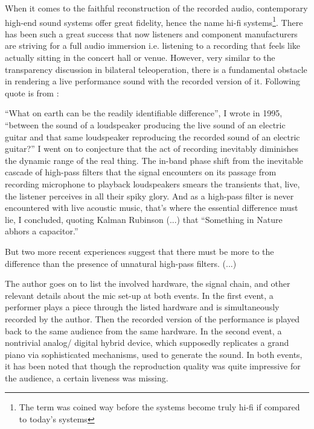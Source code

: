 When it comes to the faithful reconstruction of the recorded audio, contemporary high-end sound systems offer great fidelity, hence 
the name hi-fi systems\footnote{The term was coined way before the systems become truly hi-fi if compared to today's systems}. There has 
been such a great success that now listeners and component manufacturers are striving for a full audio immersion i.e. listening to 
a recording that feels like actually sitting in the concert hall or venue. However, very similar to the transparency discussion 
in bilateral teleoperation, there is a fundamental obstacle in rendering a live performance sound with the recorded version of it. 
Following quote is from \cite{atkinson}:

\begin{displayquote}
\enquote{What on earth can be the readily identifiable difference}, I wrote in 1995, \enquote{between the sound of a loudspeaker 
producing the live sound of an electric guitar and that same loudspeaker reproducing the recorded sound of an electric guitar?} 
I went on to conjecture that the act of recording inevitably diminishes the dynamic range of the real thing. The in-band phase 
shift from the inevitable cascade of high-pass filters that the signal encounters on its passage from recording microphone to 
playback loudspeakers smears the transients that, live, the listener perceives in all their spiky glory. And as a high-pass filter 
is never encountered with live acoustic music, that's where the essential difference must lie, I concluded, quoting Kalman Rubinson 
(...) that \enquote{Something in Nature abhors a capacitor.}

But two more recent experiences suggest that there must be more to the difference than the presence of unnatural high-pass filters. 
(...)
\end{displayquote}

The author goes on to list the involved hardware, the signal chain, and other relevant details about the mic set-up at both events.
In the first event, a performer plays a piece through the listed hardware and is simultaneously recorded by the author. Then the recorded 
version of the performance is played back to the same audience from the same hardware. In the second event, a nontrivial analog/
digital hybrid device, which supposedly replicates a grand piano via sophisticated mechanisms, used to generate the sound. In both 
events, it has been noted that though the reproduction quality was quite impressive for the audience, a certain liveness was missing.

